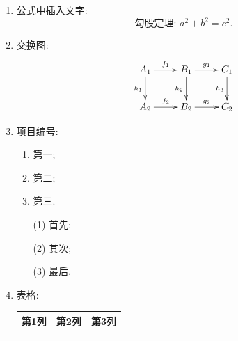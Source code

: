 \documentclass[a4paper, 11pt, UTF8]{article}
\theoremstyle{plain}
\theoremstyle{definition}
\theoremstyle{remark}
\begin{document}
\begin{enumerate}
		\item 公式中插入文字:
		\[ \text{勾股定理: } a^2+b^2=c^2. \]
		
		\item 交换图: 
		\[ \xymatrix{
		A_1 \ar[d]_{h_1} \ar[r]^{f_1} & \ar[d]_{h_2} B_1 \ar[r]^{g_1} & C_1 \ar[d]_{h_3} \\
		A_2 \ar[r]^{f_2} & B_2 \ar[r]^{g_2} & C_2} \]
		
		\item 项目编号:
		
		\begin{enumerate}
			\item 第一;
			\item 第二;
			\item 第三.
		\end{enumerate}
	
		\begin{enumerate}
			\item[(1)] 首先;
			\item[(2)] 其次;
			\item[(3)] 最后.
		\end{enumerate}
	
		\item 表格:
		\begin{center}
			\begin{tabular}{*{3}{|m{3cm}<{\centering}}|}
				\hline
				\textbf{第1列}	& \textbf{第2列} & \textbf{第3列} \\
				\hline
				&  &  \\
				\hline
			\end{tabular}
		\end{center}
	

\end{enumerate}
\end{document}
